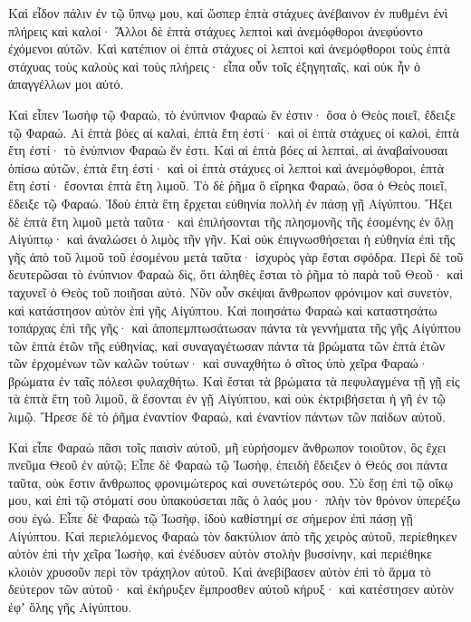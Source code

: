 {Καὶ εἶδον πάλιν ἐν τῷ ὕπνῳ μου, καὶ ὥσπερ ἑπτὰ στάχυες ἀνέβαινον ἐν πυθμένι ἑνὶ πλήρεις καὶ καλοί·
Ἄλλοι δὲ ἑπτὰ στάχυες λεπτοὶ καὶ ἀνεμόφθοροι ἀνεφύοντο ἐχόμενοι αὐτῶν.
Καὶ κατέπιον οἱ ἑπτὰ στάχυες οἱ λεπτοὶ καὶ ἀνεμόφθοροι τοὺς ἑπτὰ στάχυας τοὺς καλοὺς καὶ τοὺς πλήρεις· εἶπα οὖν τοῖς ἐξηγηταῖς, καὶ οὐκ ἦν ὁ ἀπαγγέλλων μοι αὐτό.
\par }{\PP {}Καὶ εἶπεν Ἰωσὴφ τῷ Φαραὼ, τὸ ἐνύπνιον Φαραὼ ἕν ἐστιν· ὅσα ὁ Θεὸς ποιεῖ, ἔδειξε τῷ Φαραώ.
Αἱ ἑπτὰ βόες αἱ καλαὶ, ἑπτὰ ἔτη ἐστί· καὶ οἱ ἑπτὰ στάχυες οἱ καλοὶ, ἑπτὰ ἔτη ἐστί· τὸ ἐνύπνιον Φαραὼ ἕν ἐστι.
Καὶ αἱ ἑπτὰ βόες αἱ λεπταὶ, αἱ ἀναβαίνουσαι ὀπίσω αὐτῶν, ἑπτὰ ἔτη ἐστί· καὶ οἱ ἑπτὰ στάχυες οἱ λεπτοὶ καὶ ἀνεμόφθοροι, ἑπτὰ ἔτη ἐστί· ἔσονται ἑπτὰ ἔτη λιμοῦ.
Τὸ δὲ ῥῆμα ὃ εἴρηκα Φαραὼ, ὅσα ὁ Θεὸς ποιεῖ, ἔδειξε τῷ Φαραώ.
Ἰδοὺ ἑπτὰ ἔτη ἔρχεται εὐθηνία πολλὴ ἐν πάσῃ γῇ Αἰγύπτου.
Ἥξει δὲ ἑπτὰ ἔτη λιμοῦ μετὰ ταῦτα· καὶ ἐπιλήσονται τῆς πλησμονῆς τῆς ἐσομένης ἐν ὅλῃ Αἰγύπτῳ· καὶ ἀναλώσει ὁ λιμὸς τῆν γῆν.
Καὶ οὐκ ἐπιγνωσθήσεται ἡ εὐθηνία ἐπὶ τῆς γῆς ἀπὸ τοῦ λιμοῦ τοῦ ἐσομένου μετὰ ταῦτα· ἰσχυρὸς γὰρ ἔσται σφόδρα.
Περὶ δὲ τοῦ δευτερῶσαι τὸ ἐνύπνιον Φαραὼ δὶς, ὅτι ἀληθὲς ἔσται τὸ ῥῆμα τὸ παρὰ τοῦ Θεοῦ· καὶ ταχυνεῖ ὁ Θεὸς τοῦ ποιῆσαι αὐτό.
Νῦν οὖν σκέψαι ἄνθρωπον φρόνιμον καὶ συνετὸν, καὶ κατάστησον αὐτὸν ἐπὶ γῆς Αἰγύπτου.
Καὶ ποιησάτω Φαραὼ καὶ καταστησάτω τοπάρχας ἐπὶ τῆς γῆς· καὶ ἀποπεμπτωσάτωσαν πάντα τὰ γεννήματα τῆς γῆς Αἰγύπτου τῶν ἑπτὰ ἐτῶν τῆς εὐθηνίας,
καὶ συναγαγέτωσαν πάντα τὰ βρώματα τῶν ἑπτὰ ἐτῶν τῶν ἐρχομένων τῶν καλῶν τούτων· καὶ συναχθήτω ὁ σῖτος ὑπὸ χεῖρα Φαραώ· βρώματα ἐν ταῖς πόλεσι φυλαχθήτω.
Καὶ ἔσται τὰ βρώματα τὰ πεφυλαγμένα τῇ γῇ εἰς τὰ ἑπτὰ ἔτη τοῦ λιμοῦ, ἃ ἔσονται ἐν γῇ Αἰγύπτου, καὶ οὐκ ἐκτριβήσεται ἡ γῆ ἐν τῷ λιμῷ.
Ἤρεσε δὲ τὸ ῥῆμα ἐναντίον Φαραὼ, καὶ ἐναντίον πάντων τῶν παίδων αὐτοῦ.
\par }{\PP {}Καὶ εἶπε Φαραὼ πᾶσι τοῖς παισὶν αὐτοῦ, μῆ εὑρήσομεν ἄνθρωπον τοιοῦτον, ὃς ἔχει πνεῦμα Θεοῦ ἐν αὐτῷ;
Εἶπε δὲ Φαραὼ τῷ Ἰωσὴφ, ἐπειδὴ ἔδειξεν ὁ Θεός σοι πάντα ταῦτα, οὐκ ἔστιν ἄνθρωπος φρονιμώτερος καὶ συνετώτερός σου.
Σὺ ἔσῃ ἐπὶ τῷ οἴκῳ μου, καὶ ἐπὶ τῷ στόματί σου ὑπακούσεται πᾶς ὁ λαός μου· πλὴν τὸν θρόνον ὑπερέξω σου ἐγώ.
Εἶπε δὲ Φαραὼ τῷ Ἰωσὴφ, ἰδοὺ καθίστημί σε σήμερον ἐπὶ πάσῃ γῇ Αἰγύπτου.
Καὶ περιελόμενος Φαραὼ τὸν δακτύλιον ἀπὸ τῆς χειρὸς αὐτοῦ, περίεθηκεν αὐτὸν ἐπὶ τὴν χεῖρα Ἰωσὴφ, καὶ ἐνέδυσεν αὐτὸν στολὴν βυσσίνην, καὶ περιέθηκε κλοιὸν χρυσοῦν περὶ τὸν τράχηλον αὐτοῦ.
Καὶ ἀνεβίβασεν αὐτὸν ἐπὶ τὸ ἅρμα τὸ δεύτερον τῶν αὐτοῦ· καὶ ἐκήρυξεν ἔμπροσθεν αὐτοῦ κήρυξ· καὶ κατέστησεν αὐτὸν ἐφʼ ὅλης γῆς Αἰγύπτου.
}
